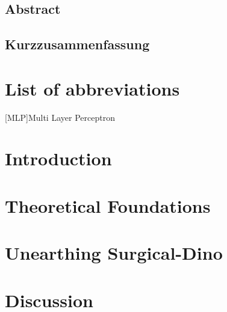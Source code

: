 \documentclass[12pt, twoside]{report_bachelorarbeit}
\renewcommand{\headrulewidth}{0.4pt}%
\renewcommand{\footrulewidth}{0.4pt}%
\renewcommand{\headrulewidth}{0.4pt}
\renewcommand{\footrulewidth}{0.4pt}
\begin{document}
\pagestyle{plain}

\section*{Abstract}

\newpage
\section*{Kurzzusammenfassung}

\newpage
%


\tableofcontents
\listoffigures
\listoftables

\chapter*{List of abbreviations}
\begin{acronym}
[MLP]{Multi Layer Perceptron}
\end{acronym}

\pagestyle{fancy}
\setlength{\headheight}{14.5pt}
\fancyhead{}
\fancyfoot{}
\fancyfoot[LE,RO]{\thepage}
\renewcommand{\headrulewidth}{0.4pt}
\renewcommand{\footrulewidth}{0.4pt}

\chapter{Introduction}
\setcounter{page}{1}

\chapter{Theoretical Foundations}

\chapter{Unearthing Surgical-Dino}

\chapter{Discussion}

\end{document}
